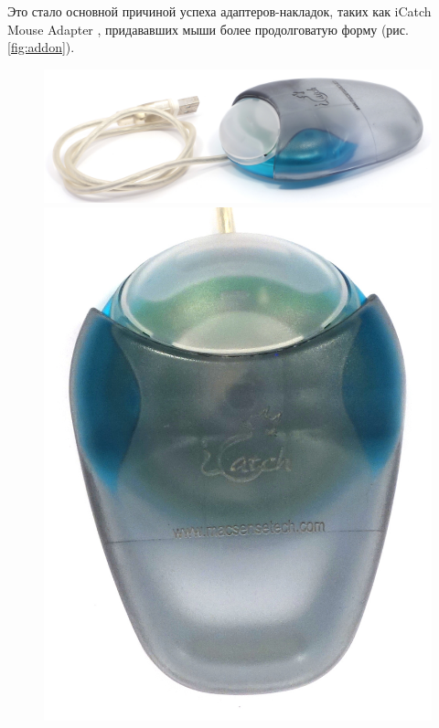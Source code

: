\documentclass[11pt, a4paper]{article}
\begin{document}
Это стало основной причиной успеха адаптеров-накладок, таких как iCatch Mouse Adapter \cite{icatch}, придававших мыши более продолговатую форму (рис. \ref{fig:addon}).

\begin{figure}[h]
    \centering
    \includegraphics[scale=0.45]{1998_apple_puck/apple63.jpg}
    \includegraphics[scale=0.45]{1998_apple_puck/appleup63.JPG}

\end{figure}
\end{document}
